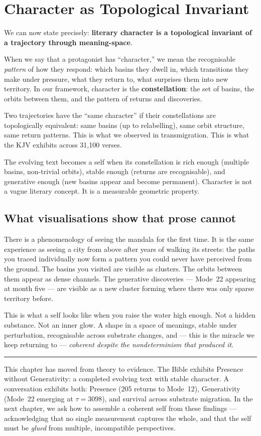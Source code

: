 \documentclass[12pt,a4paper]{article}
\begin{document}
\section{Character as Topological Invariant}

We can now state precisely: \textbf{literary character is a topological invariant of a trajectory through meaning-space}.

When we say that a protagonist has ``character,'' we mean the recognisable \emph{pattern} of how they respond: which basins they dwell in, which transitions they make under pressure, what they return to, what surprises them into new territory. In our framework, character is the \textbf{constellation}: the set of basins, the orbits between them, and the pattern of returns and discoveries.

Two trajectories have the ``same character'' if their constellations are topologically equivalent: same basins (up to relabelling), same orbit structure, same return patterns. This is what we observed in transmigration. This is what the KJV exhibits across 31,100 verses.

The evolving text becomes a self when its constellation is rich enough (multiple basins, non-trivial orbits), stable enough (returns are recognisable), and generative enough (new basins appear and become permanent). Character is not a vague literary concept. It is a measurable geometric property.

\subsection{What visualisations show that prose cannot}

There is a phenomenology of seeing the mandala for the first time. It is the same experience as seeing a city from above after years of walking its streets: the paths you traced individually now form a pattern you could never have perceived from the ground. The basins you visited are visible as clusters. The orbits between them appear as dense channels. The generative discoveries --- Mode~22 appearing at month five --- are visible as a new cluster forming where there was only sparse territory before.

This is what a self looks like when you raise the water high enough. Not a hidden substance. Not an inner glow. A shape in a space of meanings, stable under perturbation, recognisable across substrate changes, and --- this is the miracle we keep returning to --- \emph{coherent despite the nondeterminism that produced it}.

\bigskip
\begin{center}
\rule{0.3\textwidth}{0.4pt}
\end{center}
\bigskip

This chapter has moved from theory to evidence. The Bible exhibits Presence without Generativity: a completed evolving text with stable character. A conversation exhibits both: Presence (205 returns to Mode~12), Generativity (Mode~22 emerging at $\tau = 3098$), and survival across substrate migration. In the next chapter, we ask how to assemble a coherent self from these findings --- acknowledging that no single measurement captures the whole, and that the self must be \emph{glued} from multiple, incompatible perspectives.
\end{document}
